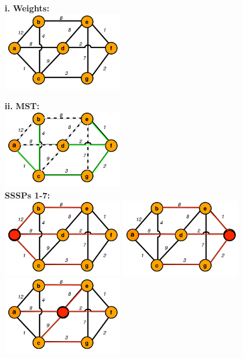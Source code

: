 \documentclass[12pt]{article} \setlength{\oddsidemargin}{0in}
\begin{document}
\begin{enumerate}
  \item[\textbf{i.}]
    \textbf{Weights:}\\
    \includegraphics[width=0.4\textwidth]{P2-weights} \\
  \item[\textbf{ii.}]
    \textbf{MST:} \\
    \includegraphics[width=0.4\textwidth]{P2-mst} \\
    \textbf{SSSPs 1-7:} \\
    \includegraphics[width=0.4\textwidth]{P2-sssp1}
    \includegraphics[width=0.4\textwidth]{P2-sssp2}\\
    \includegraphics[width=0.4\textwidth]{P2-sssp3}

\end{enumerate}
\end{document}
